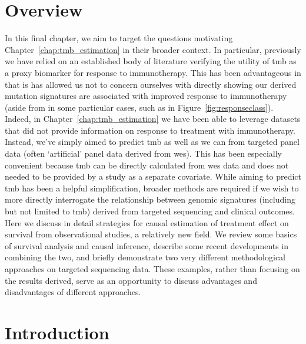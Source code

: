 \documentclass[../thesis.tex]{subfiles}
\begin{document}
\section{Overview}
In this final chapter, we aim to target the questions motivating Chapter~\ref{chap:tmb_estimation} in their broader context. In particular, previously we have relied on an established body of literature verifying the utility of \gls{tmb} as a proxy biomarker for response to immunotherapy. This has been advantageous in that is has allowed us not to concern ourselves with directly showing our derived mutation signatures are associated with improved response to immunotherapy (aside from in some particular cases, such as in Figure~\ref{fig:responseclass}). Indeed, in Chapter~\ref{chap:tmb_estimation} we have been able to leverage datasets that did not provide information on response to treatment with immunotherapy. Instead, we've simply aimed to predict \gls{tmb} as well as we can from targeted panel data (often `artificial' panel data derived from \gls{wes}). This has been especially convenient because \gls{tmb} can be directly calculated from \gls{wes} data and does not needed to be provided by a study as a separate covariate.  While aiming to predict \gls{tmb} has been a helpful simplification, broader methods are required if we wish to more directly interrogate the relationship between genomic signatures (including but not limited to \gls{tmb}) derived from targeted sequencing and clinical outcomes. Here we discuss in detail strategies for causal estimation of treatment effect on survival from observational studies, a relatively new field. We review some basics of survival analysis and causal inference, describe some recent developments in combining the two, and briefly demonstrate two very different methodological approaches on targeted sequencing data. These examples, rather than focusing on the results derived, serve as an opportunity to discuss advantages and disadvantages of different approaches.

\section{Introduction}
\end{document}
